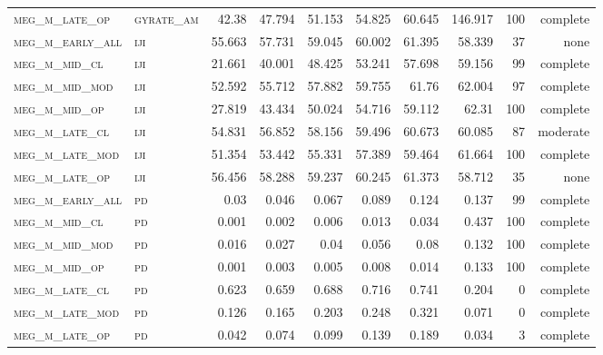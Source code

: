 \begin{landscape}
\begin{center}
\begin{footnotesize}
\begin{longtable}{llrrrrr|rrr}
\textsc{meg\_m\_late\_op  } & \textsc{gyrate\_am}   & 42.38    & 47.794   & 51.153   & 54.825   & 60.645   & 146.917  & 100 & complete \\
\textsc{meg\_m\_early\_all} & \textsc{iji       }   & 55.663   & 57.731   & 59.045   & 60.002   & 61.395   & 58.339   & 37  & none     \\
\textsc{meg\_m\_mid\_cl   } & \textsc{iji       }   & 21.661   & 40.001   & 48.425   & 53.241   & 57.698   & 59.156   & 99  & complete \\
\textsc{meg\_m\_mid\_mod  } & \textsc{iji       }   & 52.592   & 55.712   & 57.882   & 59.755   & 61.76    & 62.004   & 97  & complete \\
\textsc{meg\_m\_mid\_op   } & \textsc{iji       }   & 27.819   & 43.434   & 50.024   & 54.716   & 59.112   & 62.31    & 100 & complete \\
\textsc{meg\_m\_late\_cl  } & \textsc{iji       }   & 54.831   & 56.852   & 58.156   & 59.496   & 60.673   & 60.085   & 87  & moderate \\
\textsc{meg\_m\_late\_mod } & \textsc{iji       }   & 51.354   & 53.442   & 55.331   & 57.389   & 59.464   & 61.664   & 100 & complete \\
\textsc{meg\_m\_late\_op  } & \textsc{iji       }   & 56.456   & 58.288   & 59.237   & 60.245   & 61.373   & 58.712   & 35  & none     \\
\textsc{meg\_m\_early\_all} & \textsc{pd        }   & 0.03     & 0.046    & 0.067    & 0.089    & 0.124    & 0.137    & 99  & complete \\
\textsc{meg\_m\_mid\_cl   } & \textsc{pd        }   & 0.001    & 0.002    & 0.006    & 0.013    & 0.034    & 0.437    & 100 & complete \\
\textsc{meg\_m\_mid\_mod  } & \textsc{pd        }   & 0.016    & 0.027    & 0.04     & 0.056    & 0.08     & 0.132    & 100 & complete \\
\textsc{meg\_m\_mid\_op   } & \textsc{pd        }   & 0.001    & 0.003    & 0.005    & 0.008    & 0.014    & 0.133    & 100 & complete \\
\textsc{meg\_m\_late\_cl  } & \textsc{pd        }   & 0.623    & 0.659    & 0.688    & 0.716    & 0.741    & 0.204    & 0   & complete \\
\textsc{meg\_m\_late\_mod } & \textsc{pd        }   & 0.126    & 0.165    & 0.203    & 0.248    & 0.321    & 0.071    & 0   & complete \\
\textsc{meg\_m\_late\_op  } & \textsc{pd        }   & 0.042    & 0.074    & 0.099    & 0.139    & 0.189    & 0.034    & 3   & complete \\

\end{longtable}
\end{footnotesize}
\end{center}
\end{landscape}
